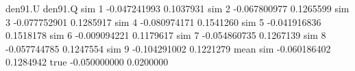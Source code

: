 \begin{Schunk}
\begin{Soutput}
              den91.U   den91.Q
sim 1    -0.047241993 0.1037931
sim 2    -0.067800977 0.1265599
sim 3    -0.077752901 0.1285917
sim 4    -0.080974171 0.1541260
sim 5    -0.041916836 0.1518178
sim 6    -0.009094221 0.1179617
sim 7    -0.054860735 0.1267139
sim 8    -0.057744785 0.1247554
sim 9    -0.104291002 0.1221279
mean sim -0.060186402 0.1284942
true     -0.050000000 0.0200000
\end{Soutput}
\end{Schunk}
